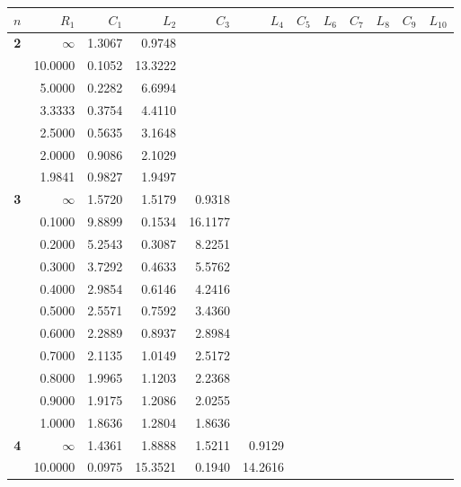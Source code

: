 \clearpage
\begin{table}[!htb]
\begin{center}
{\tiny
\begin{tabular}{|c||r|r|r|r|r|r|r|r|r|r|r|}\hline
$n$ & $R_1$   & $C_1$ & $L_2$ & $C_3$ & $L_4$ & $C_5$ & $L_6$ & $C_7$ & $L_8$ & $C_9$ & $L_{10}$\\ \hline\hline
\textbf{ 2}&$\infty$&1.3067&0.9748&     &     &     &     &     &     &     &     \\
&10.0000&0.1052&13.3222&     &     &     &     &     &     &     &     \\
&5.0000&0.2282&6.6994&     &     &     &     &     &     &     &     \\
&3.3333&0.3754&4.4110&     &     &     &     &     &     &     &     \\
&2.5000&0.5635&3.1648&     &     &     &     &     &     &     &     \\
&2.0000&0.9086&2.1029&     &     &     &     &     &     &     &     \\
&1.9841&0.9827&1.9497&     &     &     &     &     &     &     &     \\ \hline
\textbf{ 3}&$\infty$&1.5720&1.5179&0.9318&     &     &     &     &     &     &     \\
&0.1000&9.8899&0.1534&16.1177&     &     &     &     &     &     &     \\
&0.2000&5.2543&0.3087&8.2251&     &     &     &     &     &     &     \\
&0.3000&3.7292&0.4633&5.5762&     &     &     &     &     &     &     \\
&0.4000&2.9854&0.6146&4.2416&     &     &     &     &     &     &     \\
&0.5000&2.5571&0.7592&3.4360&     &     &     &     &     &     &     \\
&0.6000&2.2889&0.8937&2.8984&     &     &     &     &     &     &     \\
&0.7000&2.1135&1.0149&2.5172&     &     &     &     &     &     &     \\
&0.8000&1.9965&1.1203&2.2368&     &     &     &     &     &     &     \\
&0.9000&1.9175&1.2086&2.0255&     &     &     &     &     &     &     \\
&1.0000&1.8636&1.2804&1.8636&     &     &     &     &     &     &     \\ \hline
\textbf{ 4}&$\infty$&1.4361&1.8888&1.5211&0.9129&     &     &     &     &     &     \\
&10.0000&0.0975&15.3521&0.1940&14.2616&     &     &     &     &     &     \\

\end{tabular}}
\end{center}
\end{table}
